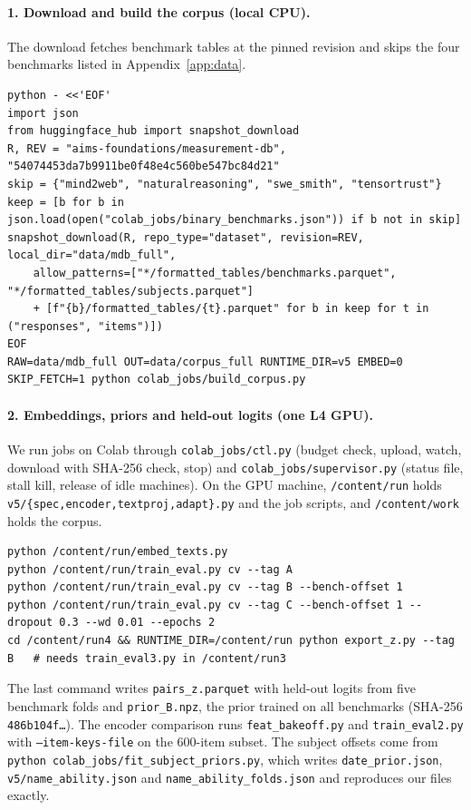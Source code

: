 \documentclass{article}
\begin{document}
\paragraph{1. Download and build the corpus (local CPU).} The download fetches benchmark tables at the pinned revision and skips the four benchmarks listed in Appendix~\ref{app:data}.
\begin{lstlisting}
python - <<'EOF'
import json
from huggingface_hub import snapshot_download
R, REV = "aims-foundations/measurement-db", "54074453da7b9911be0f48e4c560be547bc84d21"
skip = {"mind2web", "naturalreasoning", "swe_smith", "tensortrust"}
keep = [b for b in json.load(open("colab_jobs/binary_benchmarks.json")) if b not in skip]
snapshot_download(R, repo_type="dataset", revision=REV, local_dir="data/mdb_full",
    allow_patterns=["*/formatted_tables/benchmarks.parquet", "*/formatted_tables/subjects.parquet"]
    + [f"{b}/formatted_tables/{t}.parquet" for b in keep for t in ("responses", "items")])
EOF
RAW=data/mdb_full OUT=data/corpus_full RUNTIME_DIR=v5 EMBED=0 SKIP_FETCH=1 python colab_jobs/build_corpus.py
\end{lstlisting}

\paragraph{2. Embeddings, priors and held-out logits (one L4 GPU).} We run jobs on Colab through \texttt{colab\_jobs/ctl.py} (budget check, upload, watch, download with SHA-256 check, stop) and \texttt{colab\_jobs/supervisor.py} (status file, stall kill, release of idle machines). On the GPU machine, \texttt{/content/run} holds \texttt{v5/\{spec,encoder,textproj,adapt\}.py} and the job scripts, and \texttt{/content/work} holds the corpus.
\begin{lstlisting}
python /content/run/embed_texts.py
python /content/run/train_eval.py cv --tag A
python /content/run/train_eval.py cv --tag B --bench-offset 1
python /content/run/train_eval.py cv --tag C --bench-offset 1 --dropout 0.3 --wd 0.01 --epochs 2
cd /content/run4 && RUNTIME_DIR=/content/run python export_z.py --tag B   # needs train_eval3.py in /content/run3
\end{lstlisting}
The last command writes \texttt{pairs\_z.parquet} with held-out logits from five benchmark folds and \texttt{prior\_B.npz}, the prior trained on all benchmarks (SHA-256 \texttt{486b104f\ldots}). The encoder comparison runs \texttt{feat\_bakeoff.py} and \texttt{train\_eval2.py} with \texttt{--item-keys-file} on the 600-item subset. The subject offsets come from \texttt{python colab\_jobs/fit\_subject\_priors.py}, which writes \texttt{date\_prior.json}, \texttt{v5/name\_ability.json} and \texttt{name\_ability\_folds.json} and reproduces our files exactly.
\end{document}
